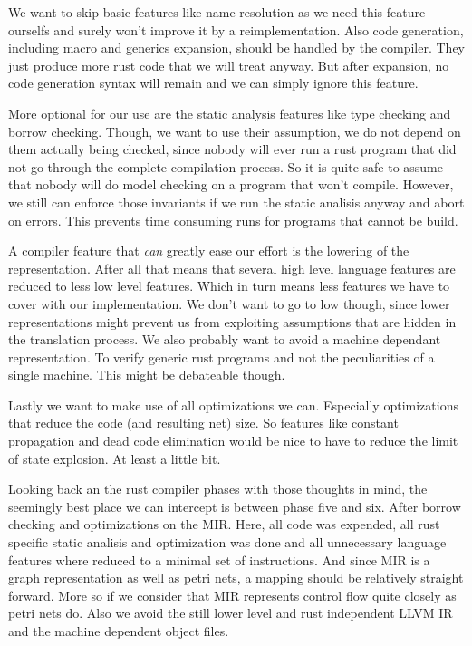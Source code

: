 We want to skip basic features like name resolution as we need this feature ourselfs and surely won't improve it by a reimplementation.
Also code generation, including macro and generics expansion, should be handled by the compiler.
They just produce more rust code that we will treat anyway.
But after expansion, no code generation syntax will remain and we can simply ignore this feature.

More optional for our use are the static analysis features like type checking and borrow checking.
Though, we want to use their assumption, we do not depend on them actually being checked, since nobody will ever run a rust program that did not go through the complete compilation process.
So it is quite safe to assume that nobody will do model checking on a program that won't compile.
However, we still can enforce those invariants if we run the static analisis anyway and abort on errors.
This prevents time consuming runs for programs that cannot be build.

A compiler feature that \textit{can} greatly ease our effort is the lowering of the representation.
After all that means that several high level language features are reduced to less low level features.
Which in turn means less features we have to cover with our implementation.
We don't want to go to low though, since lower representations might prevent us from exploiting assumptions that are hidden in the translation process.
We also probably want to avoid a machine dependant representation.
To verify generic rust programs and not the peculiarities of a single machine.
This might be debateable though.

Lastly we want to make use of all optimizations we can.
Especially optimizations that reduce the code (and resulting net) size.
So features like constant propagation and dead code elimination would be nice to have to reduce the limit of state explosion.
At least a little bit.

Looking back an the rust compiler phases with those thoughts in mind, the seemingly best place we can intercept is between phase five and six.
After borrow checking and optimizations on the MIR.
Here, all code was expended, all rust specific static analisis and optimization was done and all unnecessary language features where reduced to a minimal set of instructions.
And since MIR is a graph representation as well as petri nets, a mapping should be relatively straight forward.
More so if we consider that MIR represents control flow quite closely as petri nets do.
Also we avoid the still lower level and rust independent LLVM IR and the machine dependent object files. 

